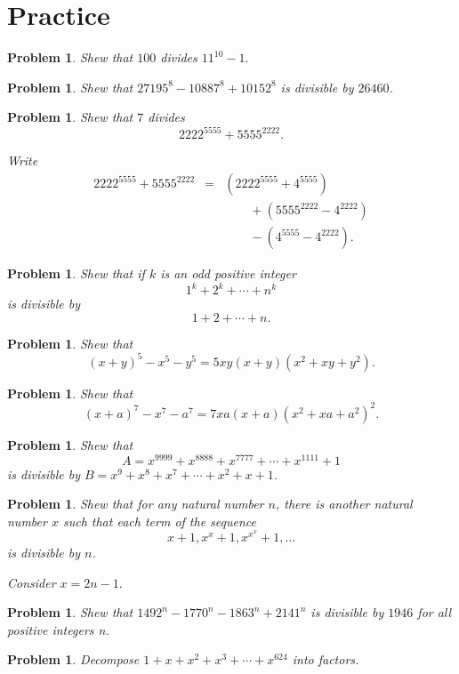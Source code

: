 \documentclass[11pt, openany]{book}
\theoremstyle{change} \theoremheaderfont{\blue\sffamily\bfseries}
\newtheorem{pro}[thm]{Problem}
\theoremstyle{nonumberplain} \theoremheaderfont{\sffamily\bfseries}
\newcommand{\í}{\'{\i}}
\begin{document}
\section*{Practice}\begin{multicols}{2}\columnseprule 1pt \columnsep 25pt

\begin{pro}
Shew that $100$ divides $11^{10} - 1.$
\end{pro}
\begin{pro} Shew that  $27195^8 - 10887^8 + 10152^8$ is divisible
by $26460$.\end{pro}
\begin{pro} Shew that $7$ divides
$$2222^{5555} + 5555^{2222}.$$
\begin{answer}
Write $$\begin{array}{lll} 2222^{5555} + 5555^{2222} & = &
(2222^{5555} + 4^{5555})\\
& & \qquad  + (5555^{2222} - 4^{2222}) \\ & & \qquad  - (4^{5555} -
4^{2222}).
\end{array}
$$
\end{answer}
\end{pro}
\begin{pro} Shew that if  $k$ is an odd positive integer
$$1^k + 2^k + \cdots + n^k$$is divisible by
$$1 + 2 + \cdots + n.$$\end{pro}
\begin{pro} Shew that
$$(x + y)^5 - x^5 - y^5 = 5xy(x + y)(x^2 + xy + y^2).$$\end{pro}
\begin{pro} Shew that $$(x + a)^7 - x^7 - a^7 = 7xa(x + a)(x^2 + xa + a^2)^2.$$  \end{pro}
\begin{pro}
Shew that $$A = x^{9999} + x^{8888} + x^{7777} + \cdots + x^{1111}
+ 1$$is divisible by $B = x^9 + x^8 + x^7 + \cdots + x^2 + x + 1$.
\end{pro}
\begin{pro}  Shew that for any natural number $n$, there is another natural number $x$ such that
each term of the sequence
$$ x + 1, x^x + 1, x^{x^x} + 1, \ldots $$ is divisible by $n$.
\begin{answer}
Consider $x = 2n - 1.$
\end{answer}


 \end{pro}

\begin{pro}
Shew that $1492^n - 1770^n - 1863^n + 2141^n$ is divisible by
$1946$ for all positive integers n.
\end{pro}
\begin{pro} Decompose $1 + x + x^{2} + x^3 + \cdots + x^{624}$ into factors.\end{pro}


\end{multicols}
\end{document}
